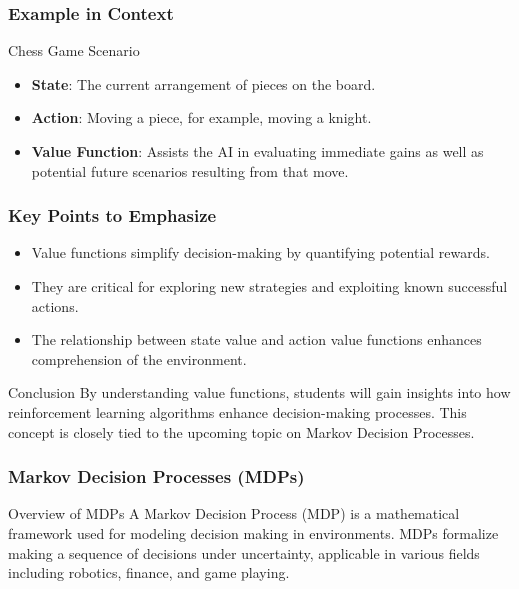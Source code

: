 \documentclass{beamer}
\begin{document}
\begin{frame}[fragile]
    \frametitle{Example in Context}
    \begin{block}{Chess Game Scenario}
        \begin{itemize}
            \item \textbf{State}: The current arrangement of pieces on the board.
            \item \textbf{Action}: Moving a piece, for example, moving a knight.
            \item \textbf{Value Function}: Assists the AI in evaluating immediate gains as well as potential future scenarios resulting from that move.
        \end{itemize}
    \end{block}
\end{frame}

\begin{frame}[fragile]
    \frametitle{Key Points to Emphasize}
    \begin{itemize}
        \item Value functions simplify decision-making by quantifying potential rewards.
        \item They are critical for exploring new strategies and exploiting known successful actions.
        \item The relationship between state value and action value functions enhances comprehension of the environment.
    \end{itemize}

    \begin{block}{Conclusion}
        By understanding value functions, students will gain insights into how reinforcement learning algorithms enhance decision-making processes. This concept is closely tied to the upcoming topic on Markov Decision Processes.
    \end{block}
\end{frame}

\begin{frame}[fragile]
    \frametitle{Markov Decision Processes (MDPs)}
    \begin{block}{Overview of MDPs}
        A Markov Decision Process (MDP) is a mathematical framework used for modeling decision making in environments. MDPs formalize making a sequence of decisions under uncertainty, applicable in various fields including robotics, finance, and game playing.
    \end{block}
\end{frame}
\end{document}
